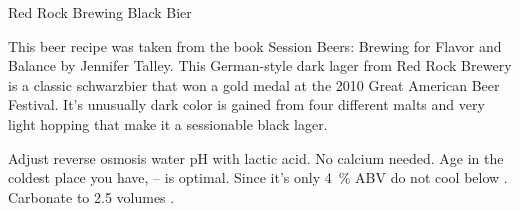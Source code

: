 \stylesection{\styleschwarzbier}

\begin{recipie}{Red Rock Brewing Black Bier}

\begin{aboutblock}
This beer recipe was taken from the book Session Beers: Brewing for Flavor and Balance by
Jennifer Talley. This German-style dark lager from Red Rock Brewery is a classic schwarzbier
that won a gold medal at the 2010 Great American Beer Festival. It's unusually dark color
is gained from four different malts and very light hopping that make it a sessionable
black lager.
\end{aboutblock}


\begin{methodandtiming}
 
\begin{mashsteps}
\end{mashsteps}

\begin{fermentationsteps}
\end{fermentationsteps}

\begin{directions}
Adjust reverse osmosis water pH with lactic acid. No calcium needed.
Age in the coldest place you have, -- is optimal. Since it's
only 4~\% ABV do not cool below . Carbonate to 2.5 volumes .
\end{directions}

\end{methodandtiming}

\pagebreak

\begin{ingredientsblock}

\begin{malts}
\end{malts}

\begin{hops}
\end{hops}

\begin{yeasts}
\end{yeasts}

\end{ingredientsblock}

\end{recipie}
